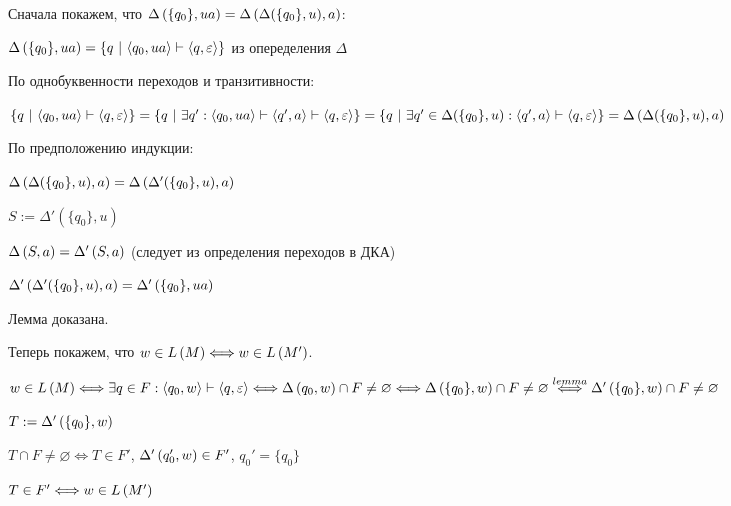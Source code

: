 Сначала покажем, что $\Delta \left({\{ q_0 \}, ua}\right) = \Delta \left({\Delta (\{ q_0 \}, u), a}\right)$:

\begin{center}
    $\Delta \left({\{ q_0 \}, ua}\right) = \{ q \,\,|\,\, \langle q_0, ua \rangle \vdash \langle q, \varepsilon \rangle \}$ из опеределения $\Delta$
    
    По однобуквенности переходов и транзитивности:
    
    $\{ q \,\,|\,\, \langle q_0, ua \rangle \vdash \langle q, \varepsilon \rangle \} = \{ q \,\,|\,\, \exists q' : \langle q_0, ua \rangle \vdash \langle q', a \rangle \vdash \langle q, \varepsilon \rangle \} = \{ q \,\,|\,\, \exists q' \in \Delta (\{q_0\}, u) : \langle q', a \rangle \vdash \langle q, \varepsilon \rangle \} = \Delta \left({\Delta(\{ q_0 \}, u), a}\right)$
\end{center}
По предположению индукции:
\begin{center}
    $\Delta \left({\Delta (\{ q_0 \}, u), a}\right) = \Delta \left({\Delta' (\{ q_0 \}, u), a}\right)$
    
    $S := \Delta' (\{ q_0 \}, u)$
    
    $\Delta \left({S, a}\right) = \Delta' \left({S, a}\right)$ (следует из определения переходов в ДКА)
    
    $\Delta' \left({\Delta' (\{ q_0 \}, u), a}\right) = \Delta' \left({\{q_0 \}, ua}\right)$
\end{center}

Лемма доказана.

Теперь покажем, что $w \in L \left({M}\right) \Longleftrightarrow w \in L \left({M'}\right)$.

\begin{center}
    $w \in L \left({M}\right) \Longleftrightarrow \exists q \in F : \langle q_0, w \rangle \vdash \langle q, \varepsilon \rangle \Longleftrightarrow \Delta \left({q_0, w}\right) \cap F \neq \varnothing \Longleftrightarrow \Delta \left({\{ q_0 \}, w}\right) \cap F \neq \varnothing \overset{lemma}{\Longleftrightarrow} \Delta' \left({\{ q_0 \}, w}\right) \cap F \neq \varnothing$
    
    $T := \Delta' \left({\{ q_0 \}, w}\right)$
    
    $T \cap F \neq \varnothing \Longleftrightarrow T \in F'$, $\Delta' \left({q_0', w}\right) \in F'$, $q_0' = \{ q_0 \}$
    
    $T \in F' \Longleftrightarrow w \in L \left({M'}\right)$ \qquad  \EndProof
\end{center}